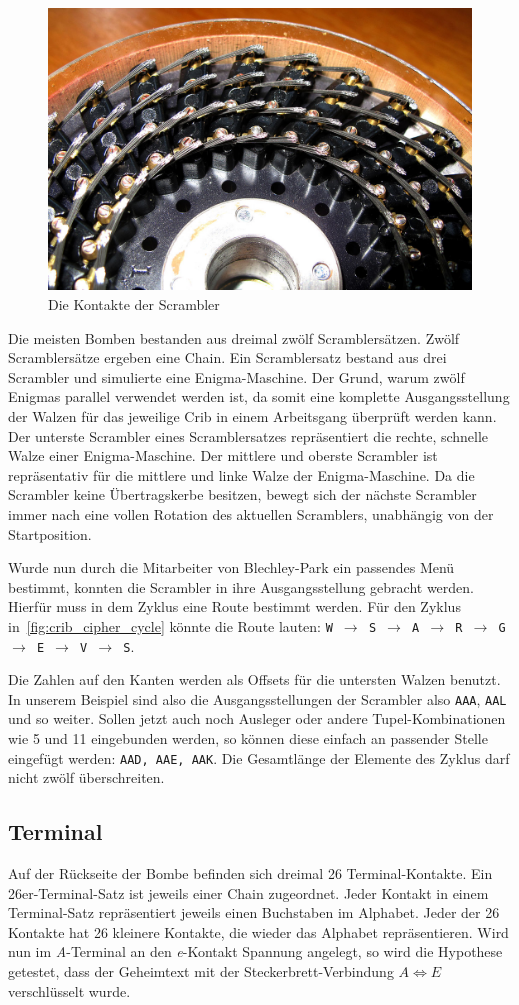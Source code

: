 \begin{figure}[htbp]
	\centering
	\includegraphics[width=0.4\linewidth]{Turing Bomb/WireBrushesOnBombeDrum}
	\caption{Die Kontakte der Scrambler\autocite{wiki:bombescrambler}}
	\label{fig:scrambler}
\end{figure} 


Die meisten Bomben bestanden aus dreimal zwölf Scramblersätzen.
Zwölf Scramblersätze ergeben eine \glqq Chain\grqq.
Ein Scramblersatz bestand aus drei Scrambler und simulierte eine Enigma-Maschine.
Der Grund, warum zwölf \glqq Enigmas\grqq{} parallel verwendet werden ist, da somit eine komplette Ausgangsstellung der Walzen für das jeweilige Crib in einem Arbeitsgang überprüft werden kann.
Der unterste Scrambler eines Scramblersatzes repräsentiert die rechte, schnelle Walze einer Enigma-Maschine.
Der mittlere und oberste Scrambler ist repräsentativ für die mittlere und linke Walze der Enigma-Maschine.
Da die Scrambler keine Übertragskerbe besitzen, bewegt sich der nächste Scrambler immer nach eine vollen Rotation des aktuellen Scramblers, unabhängig von der Startposition. 

Wurde nun durch die Mitarbeiter von Blechley-Park ein passendes Menü bestimmt, konnten die Scrambler in ihre Ausgangsstellung gebracht werden. 
Hierfür muss in dem Zyklus eine \glqq Route\grqq{} bestimmt werden.
Für den Zyklus in~\cref{fig:crib_cipher_cycle} könnte die Route lauten: \texttt{W $\rightarrow$ S $\rightarrow$ A $\rightarrow$ R $\rightarrow$ G $\rightarrow$ E $\rightarrow$ V $\rightarrow$ S}.

Die Zahlen auf den Kanten werden als \glqq Offsets\grqq{} für die untersten Walzen benutzt.
In unserem Beispiel sind also die Ausgangsstellungen der Scrambler also \texttt{AAA}, \texttt{AAL} und so weiter.
Sollen jetzt auch noch Ausleger oder andere Tupel-Kombinationen wie 5 und 11 eingebunden werden, so können diese einfach an passender Stelle eingefügt werden: \texttt{AAD, AAE, AAK}.
Die Gesamtlänge der Elemente des Zyklus darf nicht zwölf überschreiten.

\subsection{Terminal}\label{subsec:terminal}
Auf der Rückseite der Bombe befinden sich dreimal 26 Terminal-Kontakte.
Ein 26er-Terminal-Satz ist jeweils einer Chain zugeordnet.
Jeder Kontakt in einem Terminal-Satz repräsentiert jeweils einen Buchstaben im Alphabet.
Jeder der 26 Kontakte hat 26 kleinere Kontakte, die wieder das Alphabet repräsentieren.
Wird nun im \emph{A}-Terminal an den \emph{e}-Kontakt Spannung angelegt, so wird die Hypothese getestet, dass der Geheimtext mit der Steckerbrett-Verbindung $A \Leftrightarrow E$ verschlüsselt wurde.

